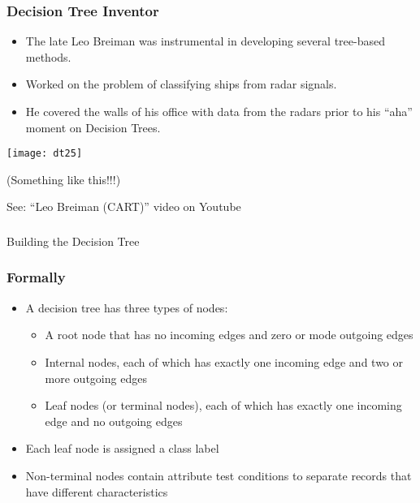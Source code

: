 \begin{frame}[fragile]\frametitle{Decision Tree Inventor}
\begin{itemize}
\item The late Leo Breiman was instrumental in developing several tree-based methods. 
\item Worked on the problem of classifying ships from radar signals. 
\item He covered the walls of his office with data from the radars prior to his “aha” moment on Decision Trees.
\end{itemize}

\begin{center}
\texttt{[image: dt25]}

(Something like this!!!)
\end{center}

See: ``Leo Breiman (CART)'' video on Youtube
\end{frame}

\begin{frame}[fragile]\frametitle{}
\begin{center}
{\Large Building the Decision Tree}
\end{center}
\end{frame}


\begin{frame}[fragile]\frametitle{Formally}
\begin{itemize}
\item A decision tree has three types of nodes:

\begin{itemize}
\item A root node that has no incoming edges and zero or mode outgoing edges
\item Internal nodes, each of which has exactly one incoming edge and two or more outgoing edges
\item Leaf nodes (or terminal nodes), each of which has exactly one incoming edge and no outgoing edges
\end{itemize}
\item Each leaf node is assigned a class label
\item Non-terminal nodes contain attribute test conditions to separate records that have different characteristics
\end{itemize}
\end{frame}

